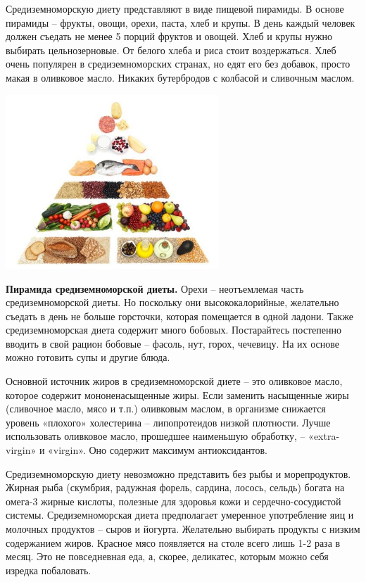Средиземноморскую диету представляют в виде пищевой пирамиды. В основе пирамиды – фрукты, овощи, орехи, паста, хлеб и крупы. В день каждый человек должен съедать не менее 5 порций фруктов и овощей. Хлеб и крупы нужно выбирать цельнозерновые. От белого хлеба и риса стоит воздержаться. Хлеб очень популярен в средиземноморских странах, но едят его без добавок, просто макая в оливковое масло. Никаких бутербродов с колбасой и сливочным маслом.

\begin{center}
    \includegraphics[width=0.6\textwidth]{img/mediterranean_diet_pyramid.jpg}
\end{center}


\textbf{Пирамида средиземноморской диеты.} Орехи – неотъемлемая часть средиземноморской диеты. Но поскольку они высококалорийные, желательно съедать в день не больше горсточки, которая помещается в одной ладони. Также средиземноморская диета содержит много бобовых. Постарайтесь постепенно вводить в свой рацион бобовые – фасоль, нут, горох, чечевицу. На их основе можно готовить супы и другие блюда.

Основной источник жиров в средиземноморской диете – это оливковое масло, которое содержит мононенасыщенные жиры. Если заменить насыщенные жиры (сливочное масло, мясо и т.п.) оливковым маслом, в организме снижается уровень «плохого» холестерина – липопротеидов низкой плотности. Лучше использовать оливковое масло, прошедшее наименьшую обработку, – «extra-virgin» и «virgin». Оно содержит максимум антиоксидантов.

Средиземноморскую диету невозможно представить без рыбы и морепродуктов. Жирная рыба (скумбрия, радужная форель, сардина, лосось, сельдь) богата на омега-3 жирные кислоты, полезные для здоровья кожи и сердечно-сосудистой системы. Средиземноморская диета предполагает умеренное употребление яиц и молочных продуктов – сыров и йогурта. Желательно выбирать продукты с низким содержанием жиров. Красное мясо появляется на столе всего лишь 1-2 раза в месяц. Это не повседневная еда, а, скорее, деликатес, которым можно себя изредка побаловать.


